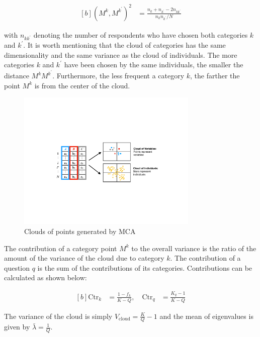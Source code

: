 \documentclass[conference,final,]{IEEEtran}
\begin{document}
\begin{equation}
\begin{aligned}[b]
\label{eq:distCat}
(M^k, M^{k^{\prime}})^2 &= \frac{n_k + n_{k^\prime} - 2 n_{kk^\prime} }{n_k n_{k^\prime}/N}
\end{aligned}
\end{equation}

with \(n_{kk^\prime}\) denoting the number of respondents who have
chosen both categories \(k\) and \(k^\prime.\) It is worth mentioning
that the cloud of categories has the same dimensionality and the same
variance as the cloud of individuals. The more categories \(k\) and
\(k^\prime\) have been chosen by the same individuals, the smaller the
distance \(M^kM^{k^\prime}\). Furthermore, the less frequent a category
\(k\), the farther the point \(M^k\) is from the center of the cloud.

\begin{figure}[!t] 
\centering 
\includegraphics[width=3.4in]{../figs/mcaIdeaNew.pdf}
\caption{Clouds of points generated by MCA}
\label{fig:fig_MCAillustration} 
\end{figure}

The contribution of a category point \(M^k\) to the overall variance is
the ratio of the amount of the variance of the cloud due to category
\(k\). The contribution of a question \(q\) is the sum of the
contributions of its categories. Contributions can be calculated as
shown below:

\begin{equation}
\begin{aligned}[b]
\label{eq:contribMk}
\text{Ctr}_k &= \frac{1-f_k}{K-Q}, \quad \text{Ctr}_q &= \frac{K_q -1 }{K-Q}
\end{aligned}
\end{equation}

The variance of the cloud is simply
\(V_{\text{cloud}} = \frac{K}{Q} - 1\) and the mean of eigenvalues is
given by \(\bar{\lambda} = \frac{1}{Q}.\)
\end{document}
